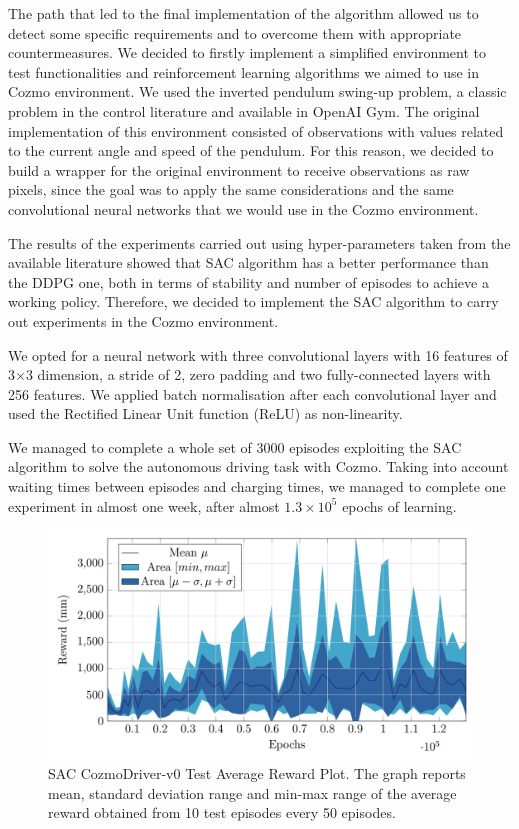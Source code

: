 \documentclass[10pt,twocolumn,letterpaper]{article}
\begin{document}
The path that led to the final implementation of the algorithm allowed us to detect some specific requirements and to overcome them with appropriate countermeasures.
We decided to firstly implement a simplified environment to test functionalities and reinforcement learning algorithms we aimed to use in Cozmo environment.
We used the inverted pendulum swing-up problem, a classic problem in the control literature and available in OpenAI Gym.
The original implementation of this environment consisted of observations with values related to the current angle and speed of the pendulum.
For this reason, we decided to build a wrapper for the original environment to receive observations as raw pixels, since the goal was to apply the same considerations and the same convolutional neural networks that we would use in the Cozmo environment.

The results of the experiments carried out using hyper-parameters taken from the available literature showed that SAC algorithm has a better performance than the DDPG one, both in terms of stability and number of episodes to achieve a working policy.
Therefore, we decided to implement the SAC algorithm to carry out experiments in the Cozmo environment.

We opted for a neural network with three convolutional layers with 16 features of 3$\times$3 dimension, a stride of 2, zero padding and two fully-connected layers with 256 features.
We applied batch normalisation after each convolutional layer and used the Rectified Linear Unit function (ReLU) as non-linearity.

We managed to complete a whole set of 3000 episodes exploiting the SAC algorithm to solve the autonomous driving task with Cozmo.
Taking into account waiting times between episodes and charging times, we managed to complete one experiment in almost one week, after almost $1.3\times 10^5$ epochs of learning.

\begin{figure}[tbp]
    \centering
    \includegraphics[width=0.97\columnwidth]{test_confidence.png}
    \caption[SAC CozmoDriver-v0 Test Average Reward Plot]{SAC CozmoDriver-v0 Test Average Reward Plot.
The graph reports mean, standard deviation range and min-max range of the average reward obtained from 10 test episodes every 50 episodes.}
    \label{confidence}
\end{figure}
\end{document}
